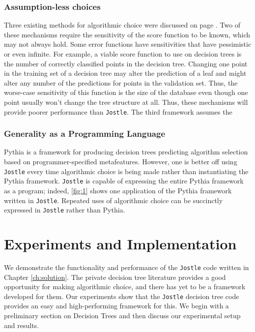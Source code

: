\documentclass[11pt]{report}
\newcommand{\Jostle}{\texttt{Jostle}}
\begin{document}
\subsection{Assumption-less choices}
Three existing methods for algorithmic choice \cite{Chaudhuri:2013} \cite{Ligett:2017} \cite{Kotsogiannis:2017}  were discussed on page \pageref{sec:algchoice}. Two of these mechanisms require the sensitivity of the score function to be known, which may not always hold. Some error functions have sensitivities that have pessimistic or even infinite. For example, a viable score function to use on decision trees is the number of correctly classified points in the decision tree. Changing one point in the training set of a decision tree may alter the prediction of a leaf and might alter any number of the predictions for points in the validation set. Thus, the worse-case sensitivity of this function is the size of the database even though one point usually won't change the tree structure at all. Thus, these mechanisms will provide poorer performance than \Jostle{}. The third framework \cite{Kotsogiannis} assumes the 

\subsection{Generality as a Programming Language}
Pythia \cite{Kotsogiannis:2017} is a framework for producing decision trees predicting algorithm selection based on programmer-specified metafeatures. However, one is better off using \Jostle{} every time algorithmic choice is being made rather than instantiating the Pythia framework. \Jostle{} is capable of expressing the entire Pythia framework as a program; indeed, \ref{fig:1} shows one application of the Pythia framework written in \Jostle{}. Repeated uses of algorithmic choice can be succinctly expressed in \Jostle{} rather than Pythia.

\chapter{Experiments and Implementation}\label{ch:experiments}
We demonstrate the functionality and performance of the \Jostle{} code written in Chapter \ref{ch:solution}. The private decision tree literature provides a good opportunity for making algorithmic choice, and there has yet to be a framework developed for them. Our experiments show that the \Jostle{} decision tree code provides an easy and high-performing framework for this. We begin with a preliminary section on Decision Trees and then discuss our experimental setup and results.
\end{document}

